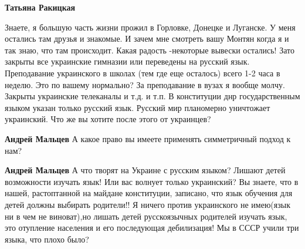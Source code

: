 \begin{itemize}
\begin{itemize}
 
\textbf{Татьяна Ракицкая} 

Знаете, я большую часть жизни прожил в Горловке, Донецке и Луганске. У меня
остались там друзья и знакомые. И зачем мне смотреть вашу Монтян когда я и так
знаю, что там происходит. Какая радость -некоторые вывески остались! Зато
закрыты все украинские гимназии или переведены на русский язык. Преподавание
украинского в школах (тем где еще осталось) всего 1-2 часа в неделю. Это по
вашему нормально? За преподавание в вузах я вообще молчу. Закрыты украинские
телеканалы и т.д. и т.п. В конституции днр государственным языком указан только
русский язык. Русский мир планомерно уничтожает украинский. Что же вы хотите
после этого от украинцев?


 
\textbf{Андрей Мальцев} А какое право вы имеете применять симметричный подход к нам?

 
\textbf{Андрей Мальцев} А что творят на Украине с русским языком? Лишают детей
возможности изучать язык! Или вас волнует только украинский? Вы знаете, что в
нашей, растоптанной на майдане конституции, записано, что язык обучения для детей
должны выбирать родители!! Я ничего против украинского не имею(язык ни в чем не
виноват),но лишать детей русскоязычных родителей изучать язык, это отупление
населения и его последующая дебилизация! Мы в СССР учили три языка, что плохо
было?

 

\end{itemize}
\end{itemize}
